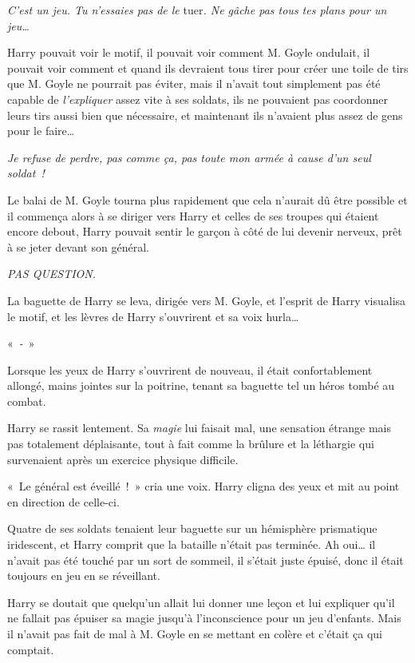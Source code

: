 {\emph{C'est un jeu.
Tu n'essaies pas de le} tuer\emph{.
Ne gâche pas tous tes plans pour un jeu…}

Harry pouvait voir le motif, il pouvait voir comment M. Goyle ondulait, il pouvait voir comment et quand ils devraient tous tirer pour créer une toile de tirs que M. Goyle ne pourrait pas éviter, mais il n'avait tout simplement pas été capable de \emph{l'expliquer} assez vite à ses soldats, ils ne pouvaient pas coordonner leurs tirs aussi bien que nécessaire, et maintenant ils n'avaient plus assez de gens pour le faire…

\emph{Je refuse de perdre, pas comme ça, pas toute mon armée à cause d'un seul soldat~!}

Le balai de M. Goyle tourna plus rapidement que cela n'aurait dû être possible et il commença alors à se diriger vers Harry et celles de ses troupes qui étaient encore debout, Harry pouvait sentir le garçon à côté de lui devenir nerveux, prêt à se jeter devant son général.

\emph{PAS QUESTION.}

La baguette de Harry se leva, dirigée vers M. Goyle, et l'esprit de Harry visualisa le motif, et les lèvres de Harry s'ouvrirent et sa voix hurla…

«~\emph{-}~»

\later

Lorsque les yeux de Harry s'ouvrirent de nouveau, il était confortablement allongé, mains jointes sur la poitrine, tenant sa baguette tel un héros tombé au combat.

Harry se rassit lentement.
Sa \emph{magie} lui faisait mal, une sensation étrange mais pas totalement déplaisante, tout à fait comme la brûlure et la léthargie qui survenaient après un exercice physique difficile.

«~Le général est éveillé~!~»
cria une voix.
Harry cligna des yeux et mit au point en direction de celle-ci.

Quatre de ses soldats tenaient leur baguette sur un hémisphère prismatique iridescent, et Harry comprit que la bataille n'était pas terminée.
Ah oui… il n'avait pas été touché par un sort de sommeil, il s'était juste épuisé, donc il était toujours en jeu en se réveillant.

Harry se doutait que quelqu'un allait lui donner une leçon et lui expliquer qu'il ne fallait pas épuiser sa magie jusqu'à l'inconscience pour un jeu d'enfants.
Mais il n'avait pas fait de mal à M. Goyle en se mettant en colère et c'était ça qui comptait.

}
